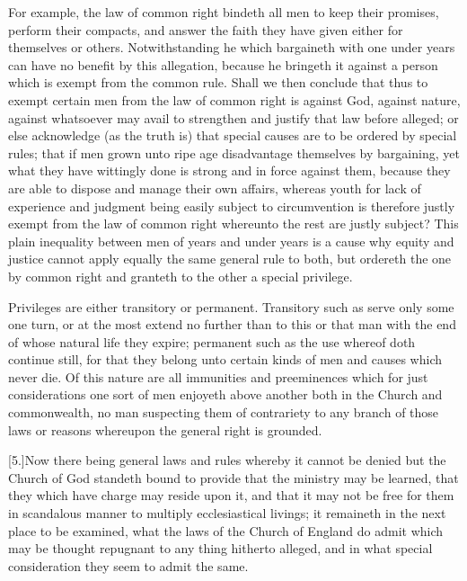 For example, the law of common right bindeth all men to keep their promises, perform their compacts, and answer the faith they have given either for themselves or others. Notwithstanding he which bargaineth with one under years can have no benefit by this allegation, because he bringeth it against a person which is exempt from the common rule. Shall we then conclude that thus to exempt certain men from the law of common right is against God, against nature, against whatsoever may avail to strengthen and justify that law before alleged; or else acknowledge (as the truth is) that special causes are to be ordered by special rules; that if men grown unto ripe age disadvantage themselves by bargaining, yet what they have wittingly done is strong and in force against them, because they are able to dispose and manage their own affairs, whereas youth for lack of experience and judgment being easily subject to circumvention is therefore justly exempt from the law of common right whereunto the rest are justly subject? This plain inequality between men of years and under years is a cause why equity and justice cannot apply equally the same general rule to both, but ordereth the one by common right and granteth to the other a special privilege.

Privileges are either transitory or permanent. Transitory such as serve only some one turn, or at the most extend no further than to this or that man with the end of whose natural life they expire; permanent such as the use whereof doth continue still, for that they belong unto certain kinds of men and causes which never die. Of this nature are all immunities and preeminences which for just considerations one sort of men enjoyeth above another both in the Church and commonwealth, no man suspecting them of contrariety to any  branch of those laws or reasons whereupon the general right is grounded.

[5.]Now there being general laws and rules whereby it cannot be denied but the Church of God standeth bound to provide that the ministry may be learned, that they which have charge may reside upon it, and that it may not be free for them in scandalous manner to multiply ecclesiastical livings; it remaineth in the next place to be examined, what the laws of the Church of England do admit which may be thought repugnant to any thing hitherto alleged, and in what special consideration they seem to admit the same.

